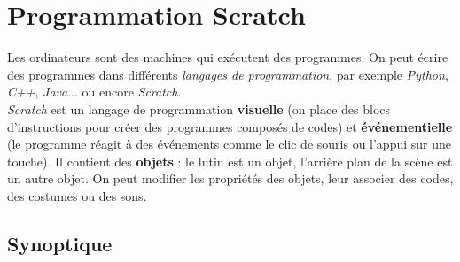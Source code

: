 \chapter{Programmation Scratch}\label{ficheScratch1}  

Les ordinateurs sont des machines qui exécutent des programmes. On peut écrire des programmes dans différents \emph{langages de programmation}, par exemple \emph{Python}, \emph{C++}, \emph{Java}... ou encore \emph{Scratch}.\\

\emph{Scratch} est un langage de programmation \textbf{visuelle} (on place des blocs d'instructions pour créer des programmes composés de codes) et \textbf{événementielle} (le programme réagit à des événements comme le clic de souris ou l'appui sur une touche). Il contient des \textbf{objets} : le lutin est un objet, l'arrière plan de la scène est un autre objet. On peut modifier les propriétés des objets, leur associer des codes, des costumes ou des sons. 

\section*{Synoptique}

